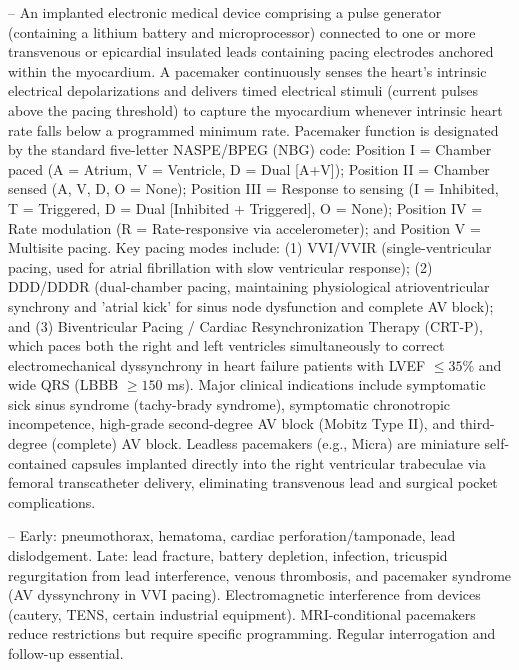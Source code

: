 -- An implanted electronic medical device comprising a pulse generator (containing a lithium battery and microprocessor) connected to one or more transvenous or epicardial insulated leads containing pacing electrodes anchored within the myocardium. A pacemaker continuously senses the heart's intrinsic electrical depolarizations and delivers timed electrical stimuli (current pulses above the pacing threshold) to capture the myocardium whenever intrinsic heart rate falls below a programmed minimum rate. Pacemaker function is designated by the standard five-letter NASPE/BPEG (NBG) code: Position I = Chamber paced (A = Atrium, V = Ventricle, D = Dual [A+V]); Position II = Chamber sensed (A, V, D, O = None); Position III = Response to sensing (I = Inhibited, T = Triggered, D = Dual [Inhibited + Triggered], O = None); Position IV = Rate modulation (R = Rate-responsive via accelerometer); and Position V = Multisite pacing. Key pacing modes include: (1) VVI/VVIR (single-ventricular pacing, used for atrial fibrillation with slow ventricular response); (2) DDD/DDDR (dual-chamber pacing, maintaining physiological atrioventricular synchrony and 'atrial kick' for sinus node dysfunction and complete AV block); and (3) Biventricular Pacing / Cardiac Resynchronization Therapy (CRT-P), which paces both the right and left ventricles simultaneously to correct electromechanical dyssynchrony in heart failure patients with LVEF $\le 35\%$ and wide QRS (LBBB $\ge 150$ ms). Major clinical indications include symptomatic sick sinus syndrome (tachy-brady syndrome), symptomatic chronotropic incompetence, high-grade second-degree AV block (Mobitz Type II), and third-degree (complete) AV block. Leadless pacemakers (e.g., Micra) are miniature self-contained capsules implanted directly into the right ventricular trabeculae via femoral transcatheter delivery, eliminating transvenous lead and surgical pocket complications.

-- Early: pneumothorax, hematoma, cardiac perforation/tamponade, lead dislodgement. Late: lead fracture, battery depletion, infection, tricuspid regurgitation from lead interference, venous thrombosis, and pacemaker syndrome (AV dyssynchrony in VVI pacing). Electromagnetic interference from devices (cautery, TENS, certain industrial equipment). MRI-conditional pacemakers reduce restrictions but require specific programming. Regular interrogation and follow-up essential.

